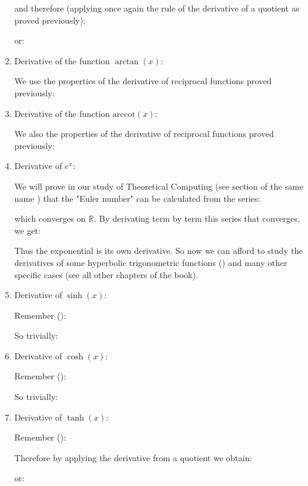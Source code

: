 \begin{enumerate}
		 	and therefore (applying once again the rule of the derivative of a quotient as proved previously):
		 	
		 	or:
		 	
		 	\item Derivative of the function  $\arctan(x)$:
		 	
		 	We use the properties of the derivative of reciprocal functions proved previously:
		 	
		 	\item Derivative of the function  $\text{arccot}(x)$:
		 	
		 	We also the properties of the derivative of reciprocal functions proved previously:
		 	
		 	\item Derivative of $e^x$:
		 	
		 	We will prove in our study of Theoretical Computing (see section of the same name \pageref{euler number computation}) that the "Euler number" can be calculated from the series:
		 	
		 	which converges on $\mathbb{R}$. By derivating term by term this series that converges, we get:
		 	
		 	Thus the exponential is its own derivative. So now we can afford to study the derivatives of some hyperbolic trigonometric functions () and many other specific cases (see all other chapters of the book).
		 	\item Derivative of $\sinh(x)$:
		 	
		 	Remember ():
		 	
		 	So trivially:
		 	
		 	
		 	\item Derivative of $\cosh(x)$:
		 	
		 	Remember ():
		 	
		 	So trivially:
		 	
		 	
		 	\item Derivative of $\tanh(x)$:
		 	
		 	Remember ():
		 	
		 	Therefore by applying the derivative from a quotient we obtain:
		 	
		 	or:
		 	

\end{enumerate}
